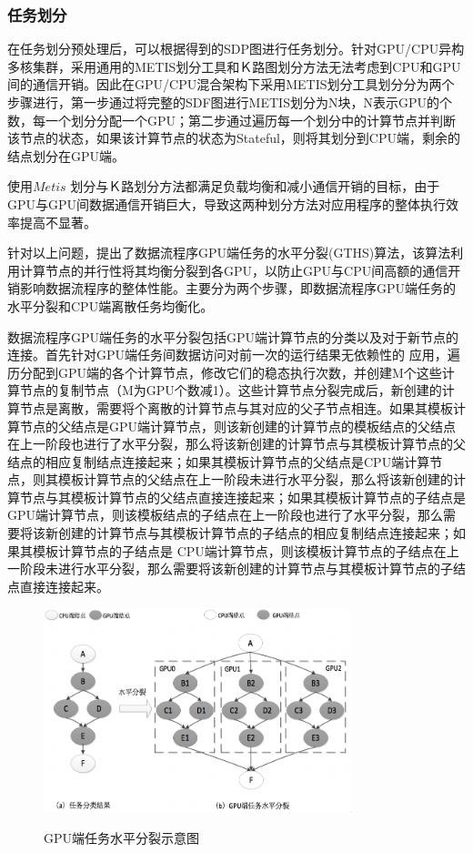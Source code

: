 \subsubsection{任务划分}

在任务划分预处理后，可以根据得到的SDP图进行任务划分。针对GPU/CPU异构多核集群，采用通用的METIS划分工具和Ｋ路图划分方法无法考虑到CPU和GPU间的通信开销。因此在GPU/CPU混合架构下采用METIS划分工具划分分为两个步骤进行，第一步通过将完整的SDF图进行METIS划分为N块，N表示GPU的个数，每一个划分分配一个GPU；第二步通过遍历每一个划分中的计算节点并判断该节点的状态，如果该计算节点的状态为Stateful，则将其划分到CPU端，剩余的结点划分在GPU端。

使用$Metis$ 划分与Ｋ路划分方法都满足负载均衡和减小通信开销的目标，由于GPU与GPU间数据通信开销巨大，导致这两种划分方法对应用程序的整体执行效率提高不显著。

针对以上问题，提出了数据流程序GPU端任务的水平分裂(GTHS)算法，该算法利用计算节点的并行性将其均衡分裂到各GPU，以防止GPU与CPU间高额的通信开销影响数据流程序的整体性能。主要分为两个步骤，即数据流程序GPU端任务的水平分裂和CPU端离散任务均衡化。

数据流程序GPU端任务的水平分裂包括GPU端计算节点的分类以及对于新节点的连接。首先针对GPU端任务间数据访问对前一次的运行结果无依赖性的 应用，遍历分配到GPU端的各个计算节点，修改它们的稳态执行次数，并创建M个这些计算节点的复制节点（M为GPU个数减1）。这些计算节点分裂完成后，新创建的计算节点是离散，需要将个离散的计算节点与其对应的父子节点相连。如果其模板计算节点的父结点是GPU端计算节点，则该新创建的计算节点的模板结点的父结点在上一阶段也进行了水平分裂，那么将该新创建的计算节点与其模板计算节点的父结点的相应复制结点连接起来；如果其模板计算节点的父结点是CPU端计算节点，则其模板计算节点的父结点在上一阶段未进行水平分裂，那么将该新创建的计算节点与其模板计算节点的父结点直接连接起来；如果其模板计算节点的子结点是GPU端计算节点，则该模板结点的子结点在上一阶段也进行了水平分裂，那么需要将该新创建的计算节点与其模板计算节点的子结点的相应复制结点连接起来；如果其模板计算节点的子结点是 CPU端计算节点，则该模板计算节点的子结点在上一阶段未进行水平分裂，那么需要将该新创建的计算节点与其模板计算节点的子结点直接连接起来。

\begin{figure}[htbp]
  \centering
  \includegraphics[width=0.8\textwidth]{Img/Chap_Application/Yu/3-1.png}\\
  \caption{GPU端任务水平分裂示意图}\label{fig:3.1}
\end{figure}

